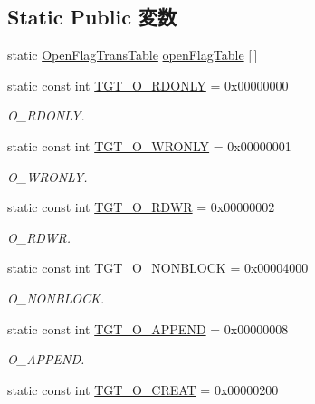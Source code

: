 \subsection*{Static Public 変数}
\begin{DoxyCompactItemize}
\item 
static \hyperlink{structOpenFlagTransTable}{OpenFlagTransTable} \hyperlink{classSparcLinux_ab1db5a531609b99b262cc849ea24765a}{openFlagTable} \mbox{[}$\,$\mbox{]}
\item 
static const int \hyperlink{classSparcLinux_ad266b23a0ae07d1833e18bae651f3411}{TGT\_\-O\_\-RDONLY} = 0x00000000
\begin{DoxyCompactList}\small\item\em O\_\-RDONLY. \item\end{DoxyCompactList}\item 
static const int \hyperlink{classSparcLinux_a6156c069cefe05ce3cce033b2e0c2de2}{TGT\_\-O\_\-WRONLY} = 0x00000001
\begin{DoxyCompactList}\small\item\em O\_\-WRONLY. \item\end{DoxyCompactList}\item 
static const int \hyperlink{classSparcLinux_ac6fa9ecf5d2f3314f197698f1099e2ac}{TGT\_\-O\_\-RDWR} = 0x00000002
\begin{DoxyCompactList}\small\item\em O\_\-RDWR. \item\end{DoxyCompactList}\item 
static const int \hyperlink{classSparcLinux_a0ea5420b4c9b45ba342a266fb77ac942}{TGT\_\-O\_\-NONBLOCK} = 0x00004000
\begin{DoxyCompactList}\small\item\em O\_\-NONBLOCK. \item\end{DoxyCompactList}\item 
static const int \hyperlink{classSparcLinux_af11adc5404ea3780a5ce2829cc3710b7}{TGT\_\-O\_\-APPEND} = 0x00000008
\begin{DoxyCompactList}\small\item\em O\_\-APPEND. \item\end{DoxyCompactList}\item 
static const int \hyperlink{classSparcLinux_aec02e04ca367e6c3f4b46e4edc12efac}{TGT\_\-O\_\-CREAT} = 0x00000200

\end{DoxyCompactItemize}
